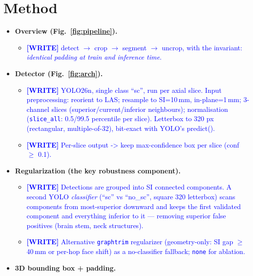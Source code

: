 \documentclass[11pt]{article}
\newcommand{\WRITE}[1]{\textcolor{blue}{\textbf{[WRITE]} #1}}
\begin{document}
\section{Method}\label{sec:method}
\begin{itemize}
  \item \textbf{Overview (Fig.~\ref{fig:pipeline}).}
    \begin{itemize}
      \item \WRITE{detect $\rightarrow$ crop $\rightarrow$ segment $\rightarrow$
            uncrop, with the invariant: \emph{identical padding at train and
            inference time}.}
    \end{itemize}
  \item \textbf{Detector (Fig.~\ref{fig:arch}).}
    \begin{itemize}
      \item \WRITE{YOLO26n, single class ``sc'', run per axial slice. Input
            preprocessing: reorient to LAS; resample to SI=10\,mm,
            in-plane=1\,mm; 3-channel slices (superior/current/inferior
            neighbours); normalisation (\texttt{slice\_all}: 0.5/99.5
            percentile per slice). Letterbox to 320 px (rectangular,
            multiple-of-32), bit-exact with YOLO's predict().}
      \item \WRITE{Per-slice output -> keep max-confidence box per slice
            (conf $\geq$ 0.1).}
    \end{itemize}
  \item \textbf{Regularization (the key robustness component).}
    \begin{itemize}
      \item \WRITE{Detections are grouped into SI connected components. A second
            YOLO \emph{classifier} (``sc'' vs ``no\_sc'', square 320 letterbox)
            scans components from most-superior downward and keeps the first
            validated component and everything inferior to it — removing
            superior false positives (brain stem, neck structures).}
      \item \WRITE{Alternative \texttt{graphtrim} regularizer (geometry-only:
            SI gap $\geq$40\,mm or per-hop face shift) as a no-classifier
            fallback; \texttt{none} for ablation.}
    \end{itemize}
  \item \textbf{3D bounding box + padding.}

\end{itemize}
\end{document}
